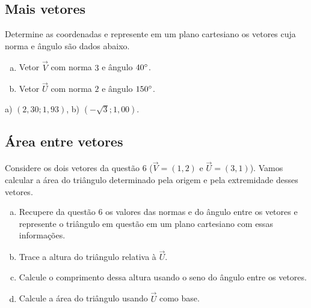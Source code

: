 \documentclass[main.tex]{subfiles}
\begin{document}
\subsection*{Mais vetores}

\begin{questao}
 Determine as coordenadas e represente em um plano cartesiano os vetores cuja norma e ângulo são dados abaixo.
\begin{enumerate}[a)]
\item Vetor $\overrightarrow{V}$ com norma $3$ e ângulo $40\degree$.
\item Vetor $\overrightarrow{U}$ com norma $2$ e ângulo $150\degree$.
\end{enumerate}
\end{questao}

\begin{gabarito}
	\begin{gabaritoQuestao}
		a) $(2,30;1,93)$, b) $(-\sqrt{3};1,00)$.
	\end{gabaritoQuestao}
\end{gabarito}

\subsection*{Área entre vetores}

\begin{questao}
Considere os dois vetores da questão 6 ($\overrightarrow{V}=(1,2)$ e $\overrightarrow{U}=(3,1)$). Vamos calcular a área do triângulo determinado pela origem e pela extremidade desses vetores.
\begin{enumerate}[a)]
\item Recupere da questão 6 os valores das normas e do ângulo entre os vetores e represente o triângulo em questão em um plano cartesiano com essas informações.
\item Trace a altura do triângulo relativa à $\overrightarrow{U}$.
\item Calcule o comprimento dessa altura usando o seno do ângulo entre os vetores.
\item Calcule a área do triângulo usando $\overrightarrow{U}$ como base.
\end{enumerate}
\end{questao}
\end{document}
